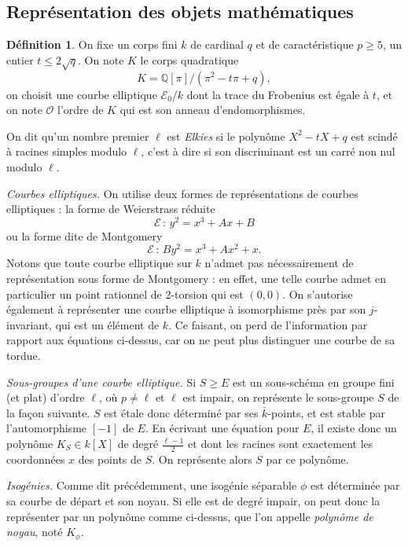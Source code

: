 \documentclass[11pt,a4paper]{article}
\newcommand{\Q}{\mathbb{Q}}
\newcommand{\E}{\mathcal{E}}
\renewcommand{\O}{\mathcal{O}}
\newcommand{\de}{\,:\,}
\theoremstyle{definition}
\newtheorem*{defi}{Définition}
\begin{document}
\vspace{5mm}

\subsection{Représentation des objets mathématiques}

\begin{defi}
On fixe un corps fini $k$ de cardinal $q$ et de caractéristique $p\geq 5$, un entier $t\leq 2\sqrt{q}$. On note $K$ le corps quadratique
$$K = \Q[\pi] / (\pi^2 - t\pi + q),$$
on choisit une courbe elliptique $\E_0/k$ dont la trace du Frobenius est égale à $t$, et on note $\O$ l'ordre de $K$ qui est son anneau d'endomorphismes.

On dit qu'un nombre premier $\ell$ est \emph{Elkies} si le polynôme $X^2 - tX + q$ est scindé à racines simples modulo $\ell$, c'est à dire si son discriminant est un carré non nul modulo $\ell$.
\end{defi}

\emph{Courbes elliptiques.} On utilise deux formes de représentations de courbes elliptiques : la forme de Weierstrass réduite
$$\E\de y^2 = x^3 + Ax + B$$
ou la forme dite de Montgomery
$$\E\de B y^2 = x^3 + A x^2 + x.$$
Notons que toute courbe elliptique sur $k$ n'admet pas nécessairement de représentation sous forme de Montgomery : en effet, une telle courbe admet en particulier un point rationnel de 2-torsion qui est $(0,0)$.
On s'autorise également à représenter une courbe elliptique à isomorphisme près par son $j$-invariant, qui est un élément de $k$. Ce faisant, on perd de l'information par rapport aux équations ci-dessus, car on ne peut plus distinguer une courbe de sa tordue.

\emph{Sous-groupes d'une courbe elliptique.} Si $S\geq E$ est un sous-schéma en groupe fini (et plat) d'ordre $\ell$, où $p\neq \ell$ et $\ell$ est impair, on représente le sous-groupe $S$ de la façon suivante. $S$ est étale donc déterminé par ses $\bar{k}$-points, et est stable par l'automorphisme $[-1]$ de $E$.
En écrivant une équation pour $E$, il existe donc un polynôme $K_S\in k[X]$ de degré $\frac{\ell-1}{2}$ et dont les racines sont exactement les coordonnées $x$ des points de $S$. On représente alors $S$ par ce polynôme.

\emph{Isogénies.} Comme dit précédemment, une isogénie séparable $\phi$ est déterminée par sa courbe de départ et son noyau. Si elle est de degré impair, on peut donc la représenter par un polynôme comme ci-dessus, que l'on appelle \emph{polynôme de noyau}, noté $K_\phi$.
\end{document}
